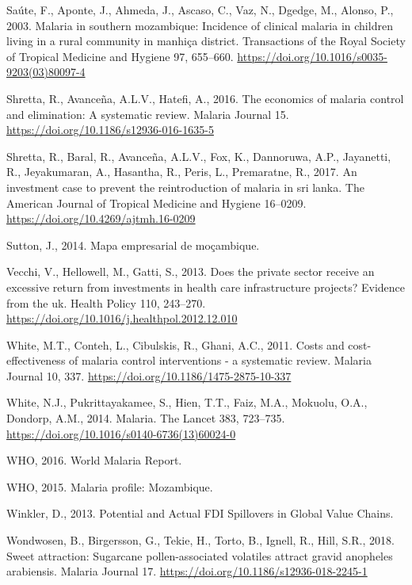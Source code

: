 \documentclass[]{article}
\begin{document}
\hypertarget{ref-Sate2003}{}
Saúte, F., Aponte, J., Ahmeda, J., Ascaso, C., Vaz, N., Dgedge, M.,
Alonso, P., 2003. Malaria in southern mozambique: Incidence of clinical
malaria in children living in a rural community in manhiça district.
Transactions of the Royal Society of Tropical Medicine and Hygiene 97,
655--660. \url{https://doi.org/10.1016/s0035-9203(03)80097-4}

\hypertarget{ref-Shretta2016}{}
Shretta, R., Avanceña, A.L.V., Hatefi, A., 2016. The economics of
malaria control and elimination: A systematic review. Malaria Journal
15. \url{https://doi.org/10.1186/s12936-016-1635-5}

\hypertarget{ref-Shretta_2017}{}
Shretta, R., Baral, R., Avanceña, A.L.V., Fox, K., Dannoruwa, A.P.,
Jayanetti, R., Jeyakumaran, A., Hasantha, R., Peris, L., Premaratne, R.,
2017. An investment case to prevent the reintroduction of malaria in sri
lanka. The American Journal of Tropical Medicine and Hygiene 16--0209.
\url{https://doi.org/10.4269/ajtmh.16-0209}

\hypertarget{ref-sutton}{}
Sutton, J., 2014. Mapa empresarial de moçambique.

\hypertarget{ref-Vecchi_2013}{}
Vecchi, V., Hellowell, M., Gatti, S., 2013. Does the private sector
receive an excessive return from investments in health care
infrastructure projects? Evidence from the uk. Health Policy 110,
243--270. \url{https://doi.org/10.1016/j.healthpol.2012.12.010}

\hypertarget{ref-White_2011}{}
White, M.T., Conteh, L., Cibulskis, R., Ghani, A.C., 2011. Costs and
cost-effectiveness of malaria control interventions - a systematic
review. Malaria Journal 10, 337.
\url{https://doi.org/10.1186/1475-2875-10-337}

\hypertarget{ref-White2014}{}
White, N.J., Pukrittayakamee, S., Hien, T.T., Faiz, M.A., Mokuolu, O.A.,
Dondorp, A.M., 2014. Malaria. The Lancet 383, 723--735.
\url{https://doi.org/10.1016/s0140-6736(13)60024-0}

\hypertarget{ref-World2016}{}
WHO, 2016. World Malaria Report.

\hypertarget{ref-whoprof}{}
WHO, 2015. Malaria profile: Mozambique.

\hypertarget{ref-Winkler}{}
Winkler, D., 2013. Potential and Actual FDI Spillovers in Global Value
Chains.

\hypertarget{ref-Wondwosen2018}{}
Wondwosen, B., Birgersson, G., Tekie, H., Torto, B., Ignell, R., Hill,
S.R., 2018. Sweet attraction: Sugarcane pollen-associated volatiles
attract gravid anopheles arabiensis. Malaria Journal 17.
\url{https://doi.org/10.1186/s12936-018-2245-1}
\end{document}
